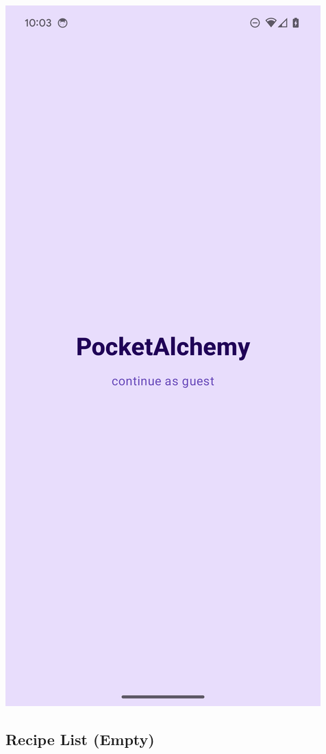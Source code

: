 \documentclass[12pt]{article}
\begin{document}
\begin{center}
\includegraphics[scale=0.175]{../res/img/LoginScreenLight.png}
\end{center}

\subsection{Recipe List (Empty)}
\end{document}
